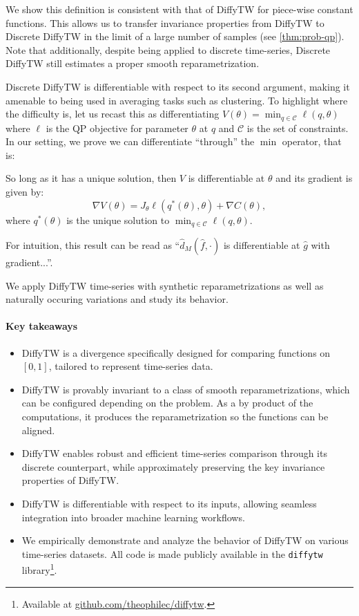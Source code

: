 We show this definition is consistent with that of DiffyTW for piece-wise constant functions. This allows us to transfer invariance properties from DiffyTW to Discrete DiffyTW in the limit of a large number of samples (see \cref{thm:prob-qp}). Note that additionally, despite being applied to discrete time-series, Discrete DiffyTW still estimates a proper smooth reparametrization. 

Discrete DiffyTW is differentiable with respect to its second argument, making it amenable to being used in averaging tasks such as clustering. To highlight where the difficulty is, let us recast this as differentiating $V(\theta) = \min_{q\in\mathcal C}\ell(q, \theta)$ where $\ell$ is the QP objective for parameter $\theta$ at $q$ and $\mathcal C$ is the set of constraints. In our setting, we prove we can differentiate ``through'' the $\min$ operator, that is:
\begin{mdframed}
\begin{informaltheorem}
So long as it has a unique solution, then $V$ is differentiable at $\theta$ and its gradient is given by:
    \begin{equation}
        \nabla V(\theta) = J_\theta \ell(q^*(\theta), \theta) + \nabla C(\theta),
    \end{equation} where $q^*(\theta)$ is the unique solution to $\min_{q\in\mathcal C}\ell(q, \theta)$.
\end{informaltheorem}
\end{mdframed}
For intuition, this result can be read as ``$\hat d_M(\hat f, \cdot)$ is differentiable at $\hat g$ with gradient...''.

We apply DiffyTW time-series with synthetic reparametrizations as well as naturally occuring variations and study its behavior.

\paragraph{Key takeaways}
\begin{itemize}
    \item DiffyTW is a divergence specifically designed for comparing functions on $[0,1]$, tailored to represent time-series data.
    \item DiffyTW is provably invariant to a class of smooth reparametrizations, which can be configured depending on the problem. As a by product of the computations, it produces the reparametrization so the functions can be aligned.
    \item DiffyTW enables robust and efficient time-series comparison through its discrete counterpart, while approximately preserving the key invariance properties of DiffyTW.
    \item DiffyTW is differentiable with respect to its inputs, allowing seamless integration into broader machine learning workflows.
    \item We empirically demonstrate and analyze the behavior of DiffyTW on various time-series datasets. All code is made publicly available in the \texttt{diffytw} library\footnote{Available at \url{github.com/theophilec/diffytw}.}.
\end{itemize}

